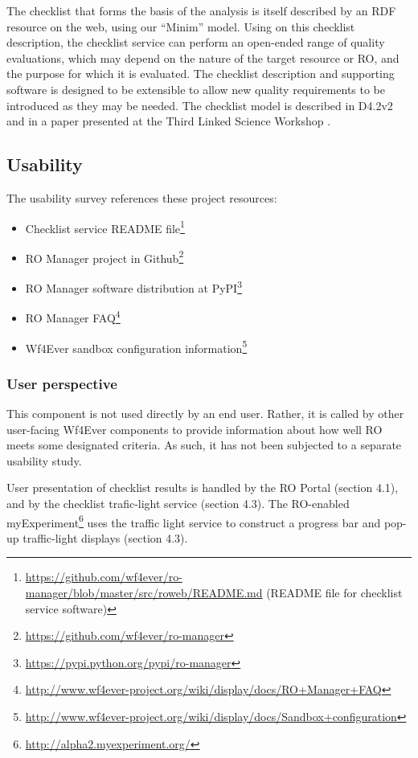 The checklist that forms the basis of the analysis is itself described
by an RDF resource on the web, using our ``Minim'' model. Using on this
checklist description, the checklist service can perform an open-ended
range of quality evaluations, which may depend on the nature of the
target resource or RO, and the purpose for which it is evaluated. The
checklist description and supporting software is designed to be
extensible to allow new quality requirements to be introduced as they
may be needed. The checklist model is described in D4.2v2 \cite{D4.2v2}
and in a paper presented at the Third Linked Science Workshop
\cite{ro_checklist}.

\subsection{Usability}

The usability survey references these project resources:

\begin{itemize}
\itemsep1pt\parskip0pt
\item
  Checklist service README file\footnote{\url{https://github.com/wf4ever/ro-manager/blob/master/src/roweb/README.md}
    (README file for checklist service software)}
\item
  RO Manager project in Github\footnote{\url{https://github.com/wf4ever/ro-manager}}
\item
  RO Manager software distribution at PyPI\footnote{\url{https://pypi.python.org/pypi/ro-manager}}
\item
  RO Manager FAQ\footnote{\url{http://www.wf4ever-project.org/wiki/display/docs/RO+Manager+FAQ}}
\item
  Wf4Ever sandbox configuration information\footnote{\url{http://www.wf4ever-project.org/wiki/display/docs/Sandbox+configuration}}
\end{itemize}

\subsubsection{User perspective}

This component is not used directly by an end user. Rather, it is called
by other user-facing Wf4Ever components to provide information about how
well RO meets some designated criteria. As such, it has not been
subjected to a separate usability study.

User presentation of checklist results is handled by the RO Portal
\cite{D1.2v4} (section 4.1), and by the checklist trafic-light service
\cite{D1.2v4} (section 4.3). The RO-enabled myExperiment\footnote{\url{http://alpha2.myexperiment.org/}}
uses the traffic light service to construct a progress bar and pop-up
traffic-light displays \cite{D1.2v4} (section 4.3).

